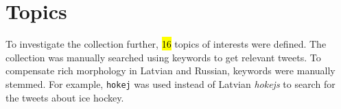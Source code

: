 \documentclass{IOS-Book-Article}
\makeatletter
\newcommand{\sn}[1]{\href{https://twitter.com/#1}{\texttt{@#1}}}
\makeatother
\begin{document}



%
%
%



\section{Topics}
\label{sec:topics}

To investigate the collection further, \hl{16} topics of interests were defined. The collection was manually searched using keywords to get relevant tweets. To compensate rich morphology in Latvian and Russian, keywords were manually stemmed. For example, \texttt{hokej} was used instead of Latvian \textit{hokejs} to search for the tweets about ice hockey. 
\end{document}
